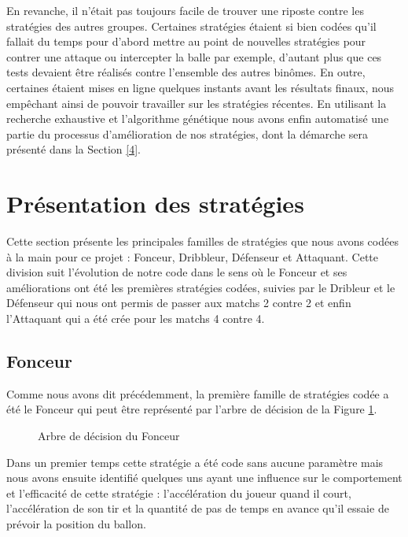 \documentclass[a4paper,12pt]{article}
\begin{document}
En revanche, il n’était pas toujours facile de trouver une riposte contre les stratégies des autres groupes. Certaines stratégies étaient si bien codées qu’il fallait du temps pour d’abord mettre au point de nouvelles stratégies pour contrer une attaque ou intercepter la balle par exemple, d’autant plus que ces tests devaient être réalisés contre l’ensemble des autres binômes. En outre, certaines étaient mises en ligne quelques instants avant les résultats finaux, nous empêchant ainsi de pouvoir travailler sur les stratégies récentes. En utilisant la recherche exhaustive et l'algorithme génétique nous avons enfin automatisé une partie du processus d’amélioration de nos stratégies, dont la démarche sera présenté dans la Section \ref{4}.

\section{Présentation des stratégies}
\label{3}

Cette section présente les principales \og familles \fg{} de stratégies que nous avons codées à la main pour ce projet : Fonceur, Dribbleur, Défenseur et Attaquant. Cette division suit l'évolution de notre code dans le sens où le Fonceur et ses améliorations ont été les premières stratégies codées, suivies par le Dribleur et le Défenseur qui nous ont permis de passer aux matchs 2 contre 2 et enfin l'Attaquant qui a été crée pour les matchs 4 contre 4.   

\subsection{Fonceur}

Comme nous avons dit précédemment, la première famille de stratégies codée a été le Fonceur qui peut être représenté par l'arbre de décision de la Figure \ref{Figure1}.

\begin{figure}[ht]
\centering

\caption{Arbre de décision du Fonceur}
\label{Figure1}
\end{figure}

Dans un premier temps cette stratégie a été code sans aucune paramètre mais nous avons ensuite identifié quelques uns ayant une influence sur le comportement et l’efficacité de cette stratégie : l’accélération du joueur quand il court, l'accélération de son tir et la quantité de pas de temps en avance qu'il essaie de prévoir la position du ballon.
\end{document}
